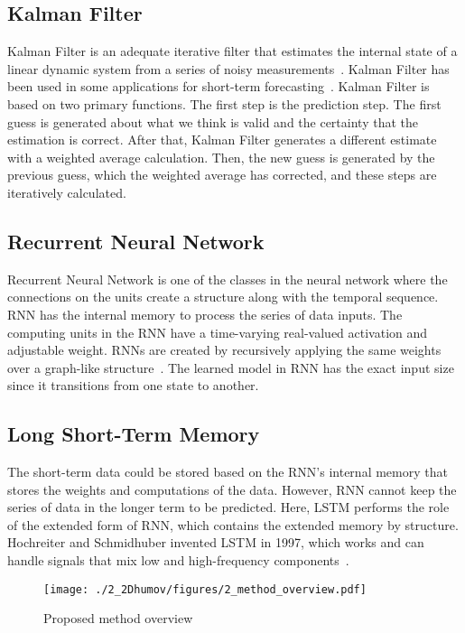 \subsection{Kalman Filter}\label{2:prelim_kalmanfilter}
Kalman Filter is an adequate iterative filter that estimates the internal state of a linear dynamic system from a series of noisy measurements~\cite{kalmanfilter}. Kalman Filter has been used in some applications for short-term forecasting~\cite{singh2021kalman}. Kalman Filter is based on two primary functions. The first step is the prediction step. The first guess is generated about what we think is valid and the certainty that the estimation is correct. After that, Kalman Filter generates a different estimate with a weighted average calculation. Then, the new guess is generated by the previous guess, which the weighted average has corrected, and these steps are iteratively calculated.

\subsection{Recurrent Neural Network}\label{2:prelim_rnn}
Recurrent Neural Network is one of the classes in the neural network where the connections on the units create a structure along with the temporal sequence. RNN has the internal memory to process the series of data inputs. The computing units in the RNN have a time-varying real-valued activation and adjustable weight. RNNs are created by recursively applying the same weights over a graph-like structure~\cite{rnn}. The learned model in RNN has the exact input size since it transitions from one state to another.

\subsection{Long Short-Term Memory}\label{2:prelim_lstm}
The short-term data could be stored based on the RNN's internal memory that stores the weights and computations of the data. However, RNN cannot keep the series of data in the longer term to be predicted. Here, LSTM performs the role of the extended form of RNN, which contains the extended memory by structure. Hochreiter and Schmidhuber invented LSTM in 1997, which works and can handle signals that mix low and high-frequency components~\cite{hochreiter1997long}.

\begin{figure}
    \centering
    \texttt{[image: ./2\_2Dhumov/figures/2\_method\_overview.pdf]}
    \caption{Proposed method overview}
    \label{fig:2_method_overview}
\end{figure}

